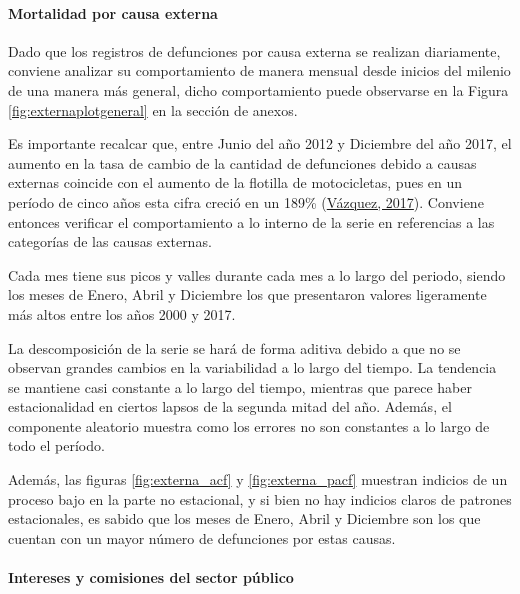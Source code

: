 \documentclass[
]{article}
\begin{document}
\paragraph{Mortalidad por causa externa}

Dado que los registros de defunciones por causa externa se realizan
diariamente, conviene analizar su comportamiento de manera mensual desde
inicios del milenio de una manera más general, dicho comportamiento
puede observarse en la Figura \ref{fig:externaplotgeneral} en la sección
de anexos.

Es importante recalcar que, entre Junio del año 2012 y Diciembre del año
2017, el aumento en la tasa de cambio de la cantidad de defunciones
debido a causas externas coincide con el aumento de la flotilla de
motocicletas, pues en un período de cinco años esta cifra creció en un
189\% (\protect\hyperlink{ref-motos}{Vázquez, 2017}). Conviene entonces
verificar el comportamiento a lo interno de la serie en referencias a
las categorías de las causas externas.

Cada mes tiene sus picos y valles durante cada mes a lo largo del
periodo, siendo los meses de Enero, Abril y Diciembre los que
presentaron valores ligeramente más altos entre los años 2000 y 2017.

La descomposición de la serie se hará de forma aditiva debido a que no
se observan grandes cambios en la variabilidad a lo largo del tiempo. La
tendencia se mantiene casi constante a lo largo del tiempo, mientras que
parece haber estacionalidad en ciertos lapsos de la segunda mitad del
año. Además, el componente aleatorio muestra como los errores no son
constantes a lo largo de todo el período.

Además, las figuras \ref{fig:externa_acf} y \ref{fig:externa_pacf}
muestran indicios de un proceso bajo en la parte no estacional, y si
bien no hay indicios claros de patrones estacionales, es sabido que los
meses de Enero, Abril y Diciembre son los que cuentan con un mayor
número de defunciones por estas causas.

\paragraph{Intereses y comisiones del sector público}
\end{document}
